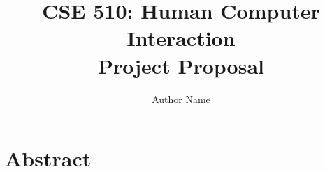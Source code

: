 \documentclass[notitlepage]{article}
\date{}
\title{{\large CSE 510: Human Computer Interaction}\\ Project Proposal}
\author{Author Name}
\begin{document}
\maketitle

\section{Abstract}
\end{document}
